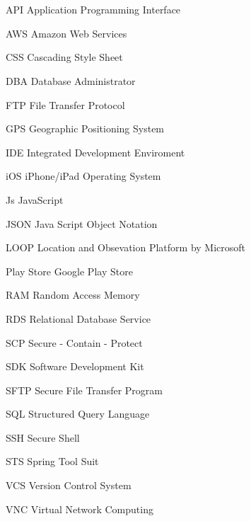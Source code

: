 \newpage
\chapter*{\abbreviationName}
\vspace{-0.3em}


\begin{abbrv}
\item[API]					Application Programming Interface
\item[AWS]					Amazon Web Services
\item[CSS]					Cascading Style Sheet
\item[DBA]					Database Administrator
\item[FTP]					File Transfer Protocol
\item[GPS]					Geographic Positioning System
\item[IDE]					Integrated Development Enviroment
\item[iOS]					iPhone/iPad Operating System
\item[Js]					JavaScript
\item[JSON]					Java Script Object Notation
\item[LOOP]					Location and Obsevation Platform by Microsoft
\item[Play Store]			Google Play Store
\item[RAM]				    Random Access Memory
\item[RDS]				    Relational Database Service
\item[SCP]                  Secure - Contain - Protect
\item[SDK]                  Software Development Kit
\item[SFTP]                 Secure File Transfer Program
\item[SQL]                  Structured Query Language
\item[SSH]                  Secure Shell
\item[STS]                  Spring Tool Suit
\item[VCS]					Version Control System
\item[VNC]					Virtual Network Computing
\end{abbrv}